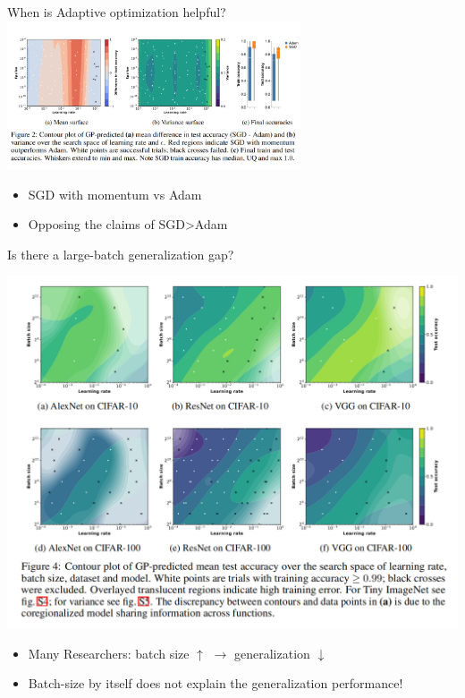 \documentclass[aspectratio=169]{beamer}
\begin{document}
\begin{frame}{When is Adaptive optimization helpful?}
  \centering
  \includegraphics[width=0.65\textwidth]{figures/optim.png}
  \begin{itemize}
    \item SGD with momentum vs Adam
    \item Opposing the claims of \cite{wilson2018} SGD>Adam
  \end{itemize}
\end{frame}

\begin{frame}{Is there a large-batch generalization gap?}
  \begin{minipage}{0.55\textwidth}
    \includegraphics[width=\textwidth]{figures/batch.png}
  \end{minipage}%
  \begin{minipage}{0.45\textwidth}
  \begin{itemize}
    \item Many Researchers: batch size $\uparrow$ $\to$ generalization $\downarrow$
    \item Batch-size by itself does not explain the generalization performance! 
  \end{itemize}
  \end{minipage}
\end{frame}
\end{document}
